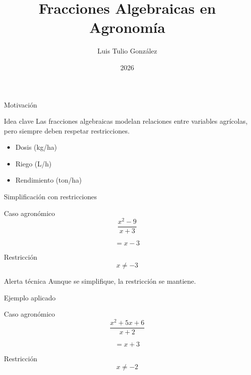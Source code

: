 \documentclass[aspectratio=169,handout,11pt]{beamer}
\title{Fracciones Algebraicas en Agronomía}
\author{Luis Tulio González}
\date{2026}
\newenvironment{idea}{\begin{block}{Idea clave}}{\end{block}}
\newenvironment{ejemplo}{\begin{exampleblock}{Caso agronómico}}{\end{exampleblock}}
\newenvironment{alerta}{\begin{alertblock}{Alerta técnica}}{\end{alertblock}}
\begin{document}
	
	\begin{frame}
		\titlepage
	\end{frame}
	
	\begin{frame}{Motivación}
		\begin{idea}
			Las fracciones algebraicas modelan relaciones entre variables agrícolas, pero siempre deben respetar restricciones.
		\end{idea}
		
		\pause
		
		\begin{itemize}[<+->]
			\item Dosis (kg/ha)
			\item Riego (L/h)
			\item Rendimiento (ton/ha)
		\end{itemize}
	\end{frame}
	
	\begin{frame}{Simplificación con restricciones}
		\begin{ejemplo}
			\[
			\frac{x^2-9}{x+3}
			\]
		\end{ejemplo}
		
		\pause
		
		\[
		= x-3
		\]
		
		\pause
		
		\begin{block}{Restricción}
			\[
			x \neq -3
			\]
		\end{block}
		
		\pause
		
		\begin{alerta}
			Aunque se simplifique, la restricción se mantiene.
		\end{alerta}
	\end{frame}
	
	\begin{frame}{Ejemplo aplicado}
		\begin{ejemplo}
			\[
			\frac{x^2+5x+6}{x+2}
			\]
		\end{ejemplo}
		
		\pause
		
		\[
		= x+3
		\]
		
		\pause
		
		\begin{block}{Restricción}
			\[
			x \neq -2
			\]
		\end{block}
	\end{frame}
	
\end{document}
